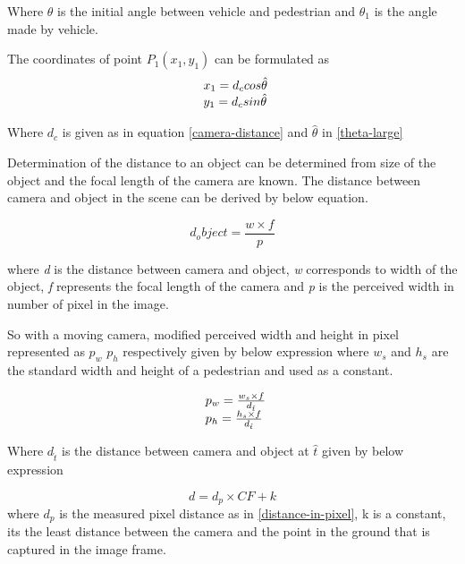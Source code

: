 Where ${\theta}$ is the initial angle between vehicle and pedestrian and ${{\theta}_1}$ is the angle made by vehicle.

The coordinates of point ${P_1(x_1, y_1)}$ can be formulated as
\begin{equation}
\begin{array}{l@{}} 
x_1 = d_c cos \hat{\theta } \\
y_1 = d_c sin \hat{\theta } 
\end{array}			
\end{equation} 

Where $d_c$ is given as in equation \ref{camera-distance} and $\hat{\theta}$ in \ref{theta-large}

Determination of the distance to an object \cite{jungel2007improving} can be determined from size of the object and the focal length of the camera are known.
The distance between camera and object in the scene can be derived by below equation.

\begin{equation} \label{distance-camera-object}
d_object = \frac{w \times f}{p}
\end{equation} 

where \textit{d} is the distance between camera and object, \textit{w} corresponds to width of the object, \textit{f} represents the focal length of the camera and \textit{p} is the perceived width in number of pixel in the image.

So with a moving camera, modified perceived width and height in pixel represented as ${p_w}$ ${p_h}$ respectively given by below expression where $w_s$ and $h_s$ are the standard width and height of a pedestrian and used as a constant.

\begin{equation} \label{new-height-width-pixels}
\begin{array}{l@{}}
{p_w} = \frac{w_s \times f}{d_{\hat{t}}} \\
{p_h} = \frac{h_s \times f}{d_{\hat{t}}}
\end{array}			
\end{equation} 

Where ${d_{\hat{t}}}$ is the distance between camera and object at ${\hat{t}}$ given by below expression

\begin{equation}
d = d_p \times {CF} + k
\end{equation}
where $d_p$ is the measured pixel distance as in \ref{distance-in-pixel}, k is a constant, its the least distance between the camera and the point in the ground that is captured in the image frame.

